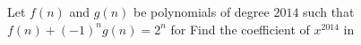 Let $f(n)$ and $g(n)$ be polynomials of degree $2014$ such that $f(n)+(-1)^ng(n)=2^n$ for   Find the coefficient of $x^{2014}$ in 